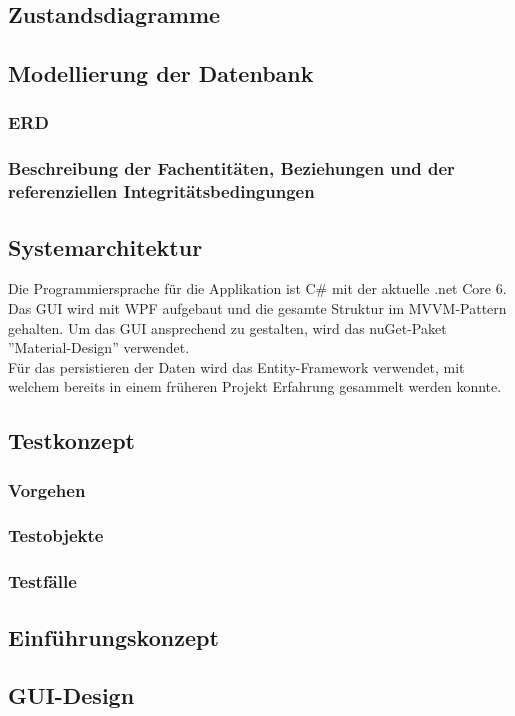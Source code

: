 \subsection{Zustandsdiagramme}
\subsection{Modellierung der Datenbank}
\subsubsection{ERD}
\subsubsection{Beschreibung der Fachentitäten, Beziehungen und der referenziellen Integritätsbedingungen}
\subsection{Systemarchitektur}
Die Programmiersprache für die Applikation ist C\# mit der aktuelle .net Core 6. Das GUI wird mit WPF aufgebaut und die gesamte Struktur im MVVM-Pattern gehalten. Um das GUI ansprechend zu gestalten, wird das nuGet-Paket ''Material-Design'' verwendet.\\
Für das persistieren der Daten wird das Entity-Framework verwendet, mit welchem bereits in einem früheren Projekt Erfahrung gesammelt werden konnte.
\subsection{Testkonzept} \label{testkonzept}
\subsubsection{Vorgehen}
\subsubsection{Testobjekte}
\subsubsection{Testfälle}
\subsection{Einführungskonzept}
\subsection{GUI-Design}